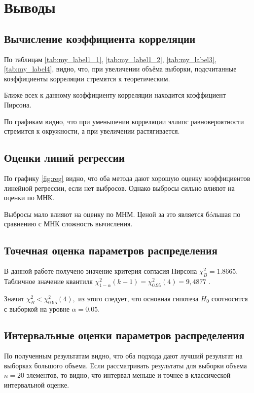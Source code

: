 \documentclass[a4]{article}
\begin{document}
\section{Выводы}
\subsection{Вычисление коэффициента корреляции}
По таблицам \ref{tab:my_label1_1}, \ref{tab:my_label1_2}, \ref{tab:my_label3}, \ref{tab:my_label4}, видно, что, при увеличении объёма выборки, подсчитанные коэффициенты корреляции стремятся к теоретическим.

Ближе всех к данному коэффициенту корреляции находится коэффициент Пирсона.

По графикам видно, что при уменьшении корреляции эллипс равновероятности стремится к окружности, а при увеличении растягивается.

\subsection{Оценки линий регрессии}
По графику \ref{fig:reg} видно, что оба метода дают хорошую оценку коэффициентов линейной регрессии, если нет выбросов. Однако выбросы сильно влияют на оценки по МНК.

Выбросы мало влияют на оценку по МНМ. Ценой за это является б\'oльшая по сравнению с МНК сложность вычисления.

\subsection{Точечная оценка параметров распределения}
В данной работе получено значение критерия согласия Пирсона $\chi_B^2 = 1.8665.$ Табличное значение квантиля  $\chi^2_{1-\alpha}(k-1)=\chi^2_{0.95}(4) = 9,4877$ \cite{chi_quant}.

Значит $\chi_B^2 < \chi^2_{0.95}(4),$ из этого следует, что основная гипотеза $H_0$ соотносится с выборкой на уровне $\alpha = 0.05.$

\subsection{Интервальные оценки параметров распределения}

По полученным результатам видно, что оба подхода дают лучший результат на выборках большого объема. Если рассматривать результаты для выборки объема $n=20$ элементов, то видно, что интервал меньше и точнее в классической интервальной оценке.
\end{document}
